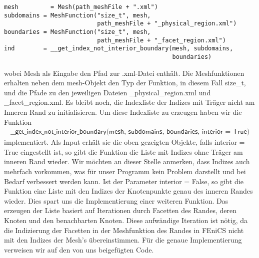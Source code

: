 \begin{lstlisting}
mesh 	     = Mesh(path_meshFile + ".xml")
subdomains = MeshFunction("size_t", mesh,
                          path_meshFile + "_physical_region.xml")
boundaries = MeshFunction("size_t", mesh, 
                          path_meshFile + "_facet_region.xml")
ind        = __get_index_not_interior_boundary(mesh, subdomains, 
                                               boundaries)  
\end{lstlisting}
wobei \textsf{Mesh} als Eingabe den Pfad zur \textsf{.xml}-Datei enthält. Die Meshfunktionen erhalten neben dem \textsf{mesh}-Objekt den Typ der Funktion, in diesem Fall \textsf{size\_t}, und die Pfade zu den jeweiligen Dateien \textsf{\_physical\_region.xml} und \textsf{\_facet\_region.xml}. Es bleibt noch, die Indexliste der Indizes mit Träger nicht am Inneren Rand zu initialisieren. Um diese Indexliste zu erzeugen haben wir die Funktion 
\begin{align*}
\textsf{\_\_get\_index\_not\_interior\_boundary(mesh, subdomains, 
boundaries, interior = True)}  
\end{align*}
implementiert. Als Input erhält sie die oben gezeigten Objekte, falls \textsf{interior = True} eingestellt ist, so gibt die Funktion die Liste mit Indizes ohne Träger am inneren Rand wieder. Wir möchten an dieser Stelle anmerken, dass Indizes auch mehrfach vorkommen, was für unser Programm kein Problem darstellt und bei Bedarf verbessert werden kann. Ist der Parameter \textsf{interior = False}, so gibt die Funktion eine Liste mit den Indizes der Knotenpunkte genau des inneren Randes wieder. Dies spart uns die Implementierung einer weiteren Funktion. Das erzeugen der Liste basiert auf Iterationen durch Facetten des Randes, deren Knoten und den benachbarten Knoten. Diese aufwändige Iteration ist nötig, da die Indizierung der Facetten in der Meshfunktion des Randes in FEniCS nicht mit den Indizes der Mesh's übereinstimmen. Für die genaue Implementierung verweisen wir auf den von uns beigefügten Code. 

